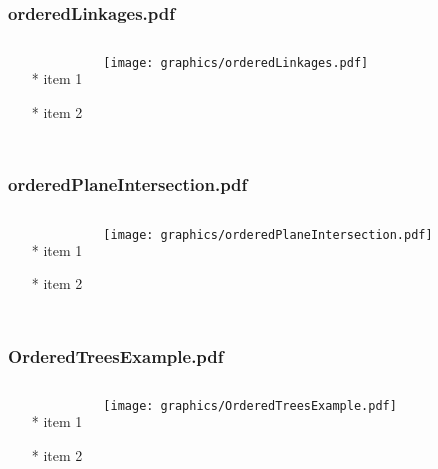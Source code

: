 \documentclass{beamer}
\begin{document}
\begin{frame} \frametitle{orderedLinkages.pdf}
    \begin{columns}[c]
        \begin{itemize}
            \item[*] item 1
            \item[*] item 2
        \end{itemize}
        \begin{minipage}{\linewidth}
            \begin{center}
            \texttt{[image: graphics/orderedLinkages.pdf]}
            \label{gfx:orderedLinkages.pdf}
            \end{center}
        \end{minipage}
    \end{columns}
\end{frame}
\begin{frame} \frametitle{orderedPlaneIntersection.pdf}
    \begin{columns}[c]
        \begin{itemize}
            \item[*] item 1
            \item[*] item 2
        \end{itemize}
        \begin{minipage}{\linewidth}
            \begin{center}
            \texttt{[image: graphics/orderedPlaneIntersection.pdf]}
            \label{gfx:orderedPlaneIntersection.pdf}
            \end{center}
        \end{minipage}
    \end{columns}
\end{frame}
\begin{frame} \frametitle{OrderedTreesExample.pdf}
    \begin{columns}[c]
        \begin{itemize}
            \item[*] item 1
            \item[*] item 2
        \end{itemize}
        \begin{minipage}{\linewidth}
            \begin{center}
            \texttt{[image: graphics/OrderedTreesExample.pdf]}
            \label{gfx:OrderedTreesExample.pdf}
            \end{center}
        \end{minipage}
    \end{columns}
\end{frame}
\end{document}
